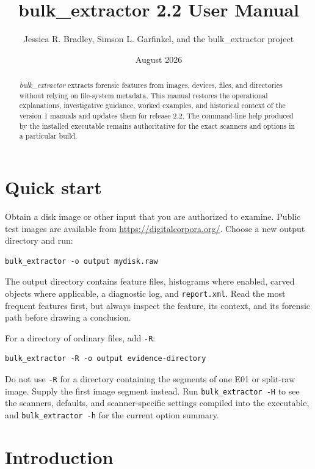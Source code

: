 \documentclass[11pt]{article}
\title{bulk\_extractor 2.2 User Manual}
\author{Jessica R. Bradley, Simson L. Garfinkel, and the bulk\_extractor project}
\date{August 2026}
\newcommand{\bulk}{\textit{bulk\_extractor}\xspace}
\newcommand{\code}[1]{\texttt{#1}}
\begin{document}
\maketitle

\begin{abstract}
\bulk extracts forensic features from images, devices, files, and directories
without relying on file-system metadata. This manual restores the operational
explanations, investigative guidance, worked examples, and historical context
of the version 1 manuals and updates them for release 2.2. The command-line
help produced by the installed executable remains authoritative for the exact
scanners and options in a particular build.
\end{abstract}

\tableofcontents
\clearpage

\section{Quick start}

Obtain a disk image or other input that you are authorized to examine. Public
test images are available from \url{https://digitalcorpora.org/}. Choose a new
output directory and run:

\begin{Verbatim}
bulk_extractor -o output mydisk.raw
\end{Verbatim}

The output directory contains feature files, histograms where enabled, carved
objects where applicable, a diagnostic log, and \code{report.xml}. Read the
most frequent features first, but always inspect the feature, its context, and
its forensic path before drawing a conclusion.

For a directory of ordinary files, add \code{-R}:

\begin{Verbatim}
bulk_extractor -R -o output evidence-directory
\end{Verbatim}

Do not use \code{-R} for a directory containing the segments of one E01 or
split-raw image. Supply the first image segment instead. Run
\code{bulk\_extractor -H} to see the scanners, defaults, and scanner-specific
settings compiled into the executable, and \code{bulk\_extractor -h} for the
current option summary.

\section{Introduction}
\end{document}
